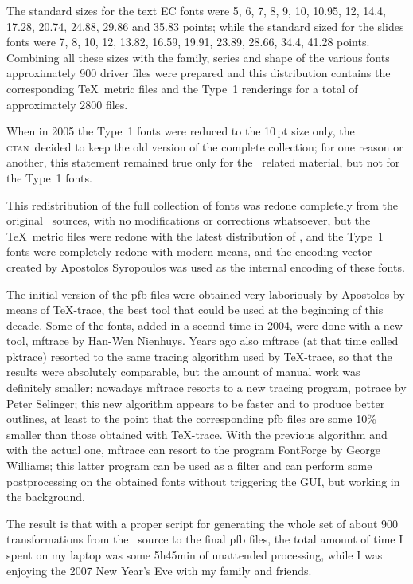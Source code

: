 \documentclass{article}
\newcommand*\ctan{\textsc{ctan}}
\begin{document}
The standard sizes for the text EC fonts were 5, 6, 7, 8, 9, 10, 10.95, 12, 14.4, 17.28, 20.74, 24.88, 29.86 and 35.83 points; while the standard sized for the slides fonts were 7, 8, 10, 12, 13.82, 16.59, 19.91, 23.89, 28.66, 34.4, 41.28 points. Combining all these sizes with the family, series and shape of the various fonts approximately 900 driver files were prepared and this distribution contains the corresponding \TeX\ metric files and the Type~1 renderings for a total of approximately 2800 files.

When in 2005 the Type~1 fonts were reduced to the 10\,pt size only, the \ctan\ decided to keep the old version of the complete collection; for one reason or another, this statement remained true only for the \MF\ related material, but not for the Type~1 fonts.

This redistribution of the full collection of fonts was redone completely from the original \MF\ sources, with no modifications or corrections whatsoever, but  the \TeX\ metric files were redone with the latest distribution of \MF, and the Type~1 fonts were completely redone with modern means, and the encoding vector created by Apostolos Syropoulos was used as the internal encoding of these fonts.

The initial version of the pfb files were obtained very laboriously by Apostolos by means of \textsf{TeX-trace}, the best tool that could be used at the beginning of this decade. Some of the fonts, added in a second time in 2004, were done with a new tool, \textsf{mftrace} by Han-Wen Nienhuys. Years ago also \textsf{mftrace} (at that time called \textsf{pktrace}) resorted to the same tracing algorithm used by \textsf{TeX-trace}, so that the results were absolutely comparable, but the amount of manual work was definitely smaller; nowadays \textsf{mftrace} resorts to a new tracing program, \textsf{potrace} by Peter Selinger; this new algorithm appears to be faster and to produce better outlines, at least to the point that the corresponding pfb files are some 10\% smaller than those obtained with \textsf{TeX-trace}. With the previous algorithm and with the actual one, \textsf{mftrace} can resort to the program \textsf{FontForge} by George Williams; this latter program can be used as a filter and can perform some postprocessing on the obtained fonts without triggering the GUI, but working in the background.

The result is that with a proper script for generating the whole set of about 900 transformations from the \MF\ source to the final pfb files, the total amount of time I spent on my laptop was some 5h45min of unattended processing, while I was enjoying the 2007 New Year's Eve with my family and friends.
\end{document}
